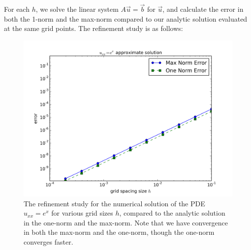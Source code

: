 \documentclass[12pt]{article}
\begin{document}
For each $h$, we solve the linear system $A\vec{u} = \vec{b}$ for $\vec{u}$, and calculate the error in both the 1-norm and the max-norm compared to our analytic solution evaluated at the same grid points.  The refinement study is as follows:
\begin{figure}[H]
\centering\includegraphics[scale=0.5]{problem1a_refinement_study.png}
\caption{The refinement study for the numerical solution of the PDE $u_{xx} = e^{x}$ for various grid sizes $h$, compared to the analytic solution in the one-norm and the max-norm. Note that we have convergence in both the max-norm and the one-norm, though the one-norm converges faster.}
\end{figure}
\end{document}
